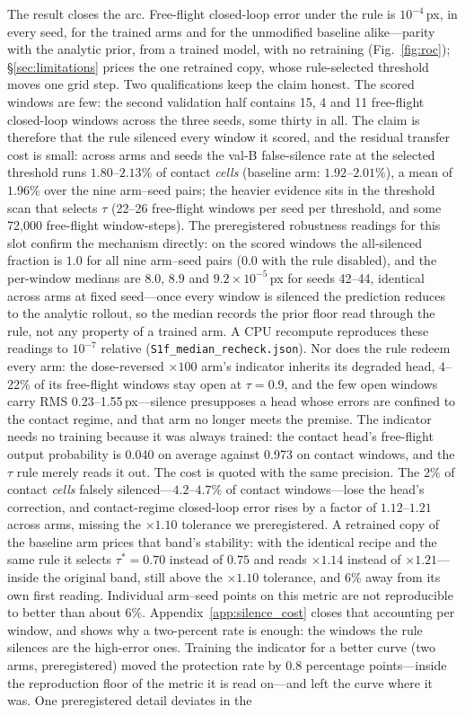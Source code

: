 \documentclass{article}
\begin{document}
The result closes the arc. Free-flight closed-loop error under the rule is $10^{-4}$\,px, in every seed, for the trained arms and for the unmodified baseline alike---parity with the analytic prior, from a trained model, with no retraining (Fig.~\ref{fig:roc}); \S\ref{sec:limitations} prices the one retrained copy, whose rule-selected threshold moves one grid step. Two qualifications keep the claim honest. The scored windows are few: the second validation half contains 15, 4 and 11 free-flight closed-loop windows across the three seeds, some thirty in all. The claim is therefore that the rule silenced every window it scored, and the residual transfer cost is small: across arms and seeds the val-B false-silence rate at the selected threshold runs $1.80$--$2.13\%$ of contact \emph{cells} (baseline arm: $1.92$--$2.01\%$), a mean of $1.96\%$ over the nine arm--seed pairs; the heavier evidence sits in the threshold scan that selects $\tau$ (22--26 free-flight windows per seed per threshold, and some 72{,}000 free-flight window-steps). The preregistered robustness readings for this slot confirm the mechanism directly: on the scored windows the all-silenced fraction is $1.0$ for all nine arm--seed pairs ($0.0$ with the rule disabled), and the per-window medians are $8.0$, $8.9$ and $9.2{\times}10^{-5}$\,px for seeds 42--44, identical across arms at fixed seed---once every window is silenced the prediction reduces to the analytic rollout, so the median records the prior floor read through the rule, not any property of a trained arm. A CPU recompute reproduces these readings to $10^{-7}$ relative (\texttt{S1f\_median\_recheck.json}). Nor does the rule redeem every arm: the dose-reversed $\times100$ arm's indicator inherits its degraded head, 4--22\% of its free-flight windows stay open at $\tau{=}0.9$, and the few open windows carry RMS 0.23--1.55\,px---silence presupposes a head whose errors are confined to the contact regime, and that arm no longer meets the premise. The indicator needs no training because it was always trained: the contact head's free-flight output probability is 0.040 on average against 0.973 on contact windows, and the $\tau$ rule merely reads it out. The cost is quoted with the same precision. The $2\%$ of contact \emph{cells} falsely silenced---$4.2$--$4.7\%$ of contact windows---lose the head's correction, and contact-regime closed-loop error rises by a factor of $1.12$--$1.21$ across arms, missing the $\times1.10$ tolerance we preregistered. A retrained copy of the baseline arm prices that band's stability: with the identical recipe and the same rule it selects $\tau^\ast{=}0.70$ instead of $0.75$ and reads $\times1.14$ instead of $\times1.21$---inside the original band, still above the $\times1.10$ tolerance, and $6\%$ away from its own first reading. Individual arm--seed points on this metric are not reproducible to better than about $6\%$. Appendix~\ref{app:silence_cost} closes that accounting per window, and shows why a two-percent rate is enough: the windows the rule silences are the high-error ones. Training the indicator for a better curve (two arms, preregistered) moved the protection rate by 0.8 percentage points---inside the reproduction floor of the metric it is read on---and left the curve where it was. One preregistered detail deviates in the 
\end{document}
